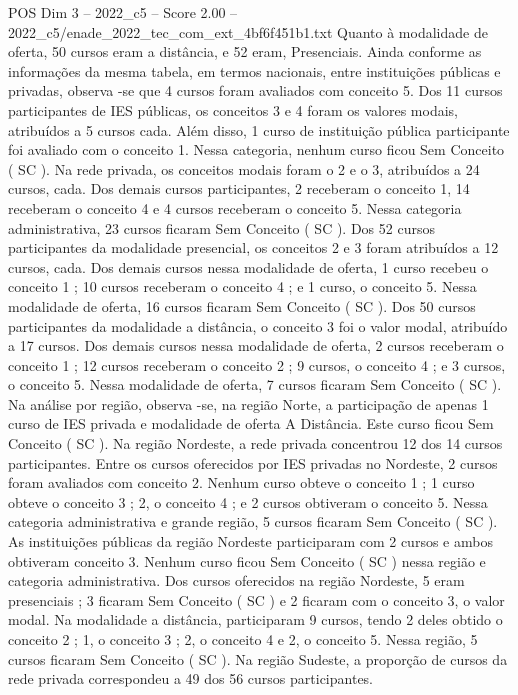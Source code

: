 \begin{textsample}{POS Dim 3 – 2022\_c5 – Score 2.00 – 2022\_c5/enade\_2022\_tec\_com\_ext\_4bf6f451b1.txt}
Quanto à modalidade de oferta, 50 cursos eram a distância, e 52 eram, Presenciais.
Ainda conforme as informações da mesma tabela, em termos nacionais, entre instituições públicas e privadas, observa -se que 4 cursos foram avaliados com conceito 5.
Dos 11 cursos participantes de IES públicas, os conceitos 3 e 4 foram os valores modais, atribuídos a 5 cursos cada.
Além disso, 1 curso de instituição pública participante foi avaliado com o conceito 1.
Nessa categoria, nenhum curso ficou Sem Conceito ( SC ).
Na rede privada, os conceitos modais foram o 2 e o 3, atribuídos a 24 cursos, cada.
Dos demais cursos participantes, 2 receberam o conceito 1, 14 receberam o conceito 4 e 4 cursos receberam o conceito 5.
Nessa categoria administrativa, 23 cursos ficaram Sem Conceito ( SC ).
Dos 52 cursos participantes da modalidade presencial, os conceitos 2 e 3 foram atribuídos a 12 cursos, cada.
Dos demais cursos nessa modalidade de oferta, 1 curso recebeu o conceito 1 ; 10 cursos receberam o conceito 4 ; e 1 curso, o conceito 5.
Nessa modalidade de oferta, 16 cursos ficaram Sem Conceito ( SC ).
Dos 50 cursos participantes da modalidade a distância, o conceito 3 foi o valor modal, atribuído a 17 cursos.
Dos demais cursos nessa modalidade de oferta, 2 cursos receberam o conceito 1 ; 12 cursos receberam o conceito 2 ; 9 cursos, o conceito 4 ; e 3 cursos, o conceito 5.
Nessa modalidade de oferta, 7 cursos ficaram Sem Conceito ( SC ).
Na análise por região, observa -se, na região Norte, a participação de apenas 1 curso de IES privada e modalidade de oferta A Distância.
Este curso ficou Sem Conceito ( SC ).
Na região Nordeste, a rede privada concentrou 12 dos 14 cursos participantes.
Entre os cursos oferecidos por IES privadas no Nordeste, 2 cursos foram avaliados com conceito 2.
Nenhum curso obteve o conceito 1 ; 1 curso obteve o conceito 3 ; 2, o conceito 4 ; e 2 cursos obtiveram o conceito 5.
Nessa categoria administrativa e grande região, 5 cursos ficaram Sem Conceito ( SC ).
As instituições públicas da região Nordeste participaram com 2 cursos e ambos obtiveram conceito 3.
Nenhum curso ficou Sem Conceito ( SC ) nessa região e categoria administrativa.
Dos cursos oferecidos na região Nordeste, 5 eram presenciais ; 3 ficaram Sem Conceito ( SC ) e 2 ficaram com o conceito 3, o valor modal.
Na modalidade a distância, participaram 9 cursos, tendo 2 deles obtido o conceito 2 ; 1, o conceito 3 ; 2, o conceito 4 e 2, o conceito 5.
Nessa região, 5 cursos ficaram Sem Conceito ( SC ).
Na região Sudeste, a proporção de cursos da rede privada correspondeu a 49 dos 56 cursos participantes.

\end{textsample}
